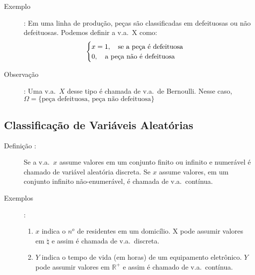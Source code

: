 \begin{description}
     \item [Exemplo]: Em uma linha de produção, peças são classificadas em defeituosas ou não
       defeituosas. Podemos definir a v.a.\ X como:
       \begin{align*}
         \begin{cases}
           x=1,\text{\quad  se a peça é defeituosa}\\ 
           0,\text{\quad  a peça não é defeituosa}
         \end{cases}
       \end{align*}
     \item [Observação]: Uma v.a.\ $X$ desse tipo é chamada de v.a.\ de Bernoulli. Nesse caso, $\Omega=\{ \text{peça defeituosa, peça não defeituosa} \}$
   \end{description}
   \subsection{Classificação de Variáveis Aleatórias}
   \begin{description}
     \item [Definição :] Se a v.a.\ $x$ assume valores em um conjunto finito ou infinito e numerável é chamado 
       de variável aleatória discreta. Se $x$ assume valores, em um conjunto infinito não-enumerável,
       é chamada de v.a.\ contínua.

     \item [Exemplos]:

       \begin{enumerate}[label=(\alph*)]
         \item $x$ indica o $n^o$ de residentes em um domicílio. X pode assumir valores em $\natural$ e assim é chamada de 
           v.a.\ discreta.

         \item $Y$ indica o tempo de vida (em horas) de um equipamento eletrônico. $Y$ pode 
           assumir valores em $\mathbb{R}^+$ e assim é chamado de v.a.\ contínua.
       \end{enumerate}
   \end{description}
